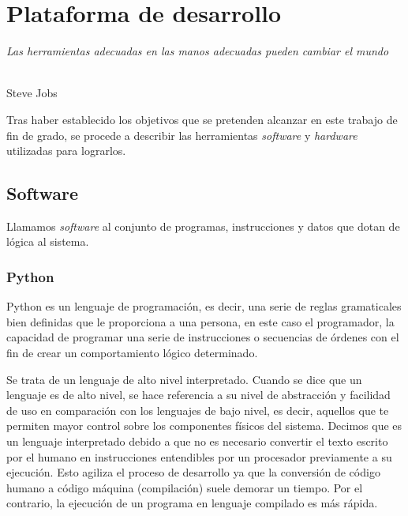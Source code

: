 \chapter{Plataforma de desarrollo}
\label{cap:capitulo4}

\begin{flushright}
\begin{minipage}[]{10cm}
\emph{Las herramientas adecuadas en las manos adecuadas pueden cambiar el mundo}\\
\end{minipage}\\
Steve Jobs\\
\end{flushright}

\vspace{1cm}
Tras haber establecido los objetivos que se pretenden alcanzar en este trabajo de fin de grado, se procede a describir
las herramientas \textit{software} y \textit{hardware} utilizadas para lograrlos. 

\section{Software}
\label{sec:software}
Llamamos \textit{software} al conjunto de programas, instrucciones y datos que dotan de lógica al sistema.
\subsection{Python}
\label{subsec:pyhton}
Python es un lenguaje de programación, es decir, una serie de reglas gramaticales bien definidas que le proporciona a una persona, en este 
caso el programador, la capacidad de programar una serie de instrucciones o secuencias de órdenes con el fin de crear un comportamiento 
lógico determinado. 

Se trata de un lenguaje de alto nivel interpretado. Cuando se dice que un lenguaje es de alto nivel, se hace referencia a su nivel de 
abstracción y facilidad de uso en comparación con los lenguajes de bajo nivel, es decir, aquellos que te permiten mayor control sobre los 
componentes físicos del sistema. Decimos que es un lenguaje interpretado debido a que no es necesario convertir el texto escrito por el humano en 
instrucciones entendibles por un procesador previamente a su ejecución. Esto agiliza el proceso de desarrollo ya que la conversión de código humano a 
código máquina (compilación) suele demorar un tiempo. Por el contrario, la ejecución de un programa en lenguaje compilado es más rápida.  

